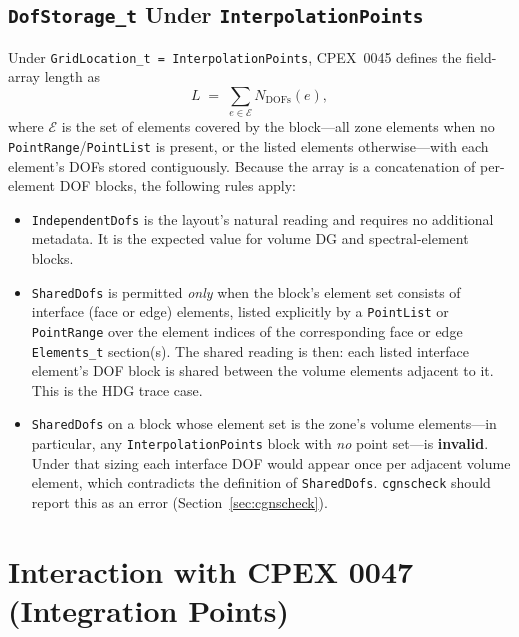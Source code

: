 \documentclass[11pt,letterpaper]{article}
\begin{document}
\subsection{\texttt{DofStorage\_t} Under \texttt{InterpolationPoints}}
\label{sec:dofstorage-interp}

Under \texttt{GridLocation\_t = InterpolationPoints}, CPEX~0045
defines the field-array length as
\[
  L \;=\; \sum_{e \in \mathcal{E}} N_{\mathrm{DOFs}}(e),
\]
where $\mathcal{E}$ is the set of elements covered by the block---all
zone elements when no \texttt{PointRange}/\texttt{PointList} is
present, or the listed elements otherwise---with each element's DOFs
stored contiguously.  Because the array is a concatenation of
per-element DOF blocks, the following rules apply:

\begin{itemize}[leftmargin=2em]
\item \texttt{IndependentDofs} is the layout's natural
  reading and requires no additional metadata.  It is the expected
  value for volume DG and spectral-element blocks.

\item \texttt{SharedDofs} is permitted \emph{only} when
  the block's element set consists of interface (face or edge)
  elements, listed explicitly by a \texttt{PointList} or
  \texttt{PointRange} over the element indices of the corresponding
  face or edge \texttt{Elements\_t} section(s).  The shared reading is
  then: each listed interface element's DOF block is shared between the
  volume elements adjacent to it.  This is the HDG trace case.

\item \texttt{SharedDofs} on a block whose element set is
  the zone's volume elements---in particular, any
  \texttt{InterpolationPoints} block with \emph{no} point set---is
  \textbf{invalid}.  Under that sizing each interface DOF would appear
  once per adjacent volume element, which contradicts the definition of
  \texttt{SharedDofs}.  \texttt{cgnscheck} should report this as an error
  (Section~\ref{sec:cgnscheck}).
\end{itemize}

\section{Interaction with CPEX 0047 (Integration Points)}
\end{document}
